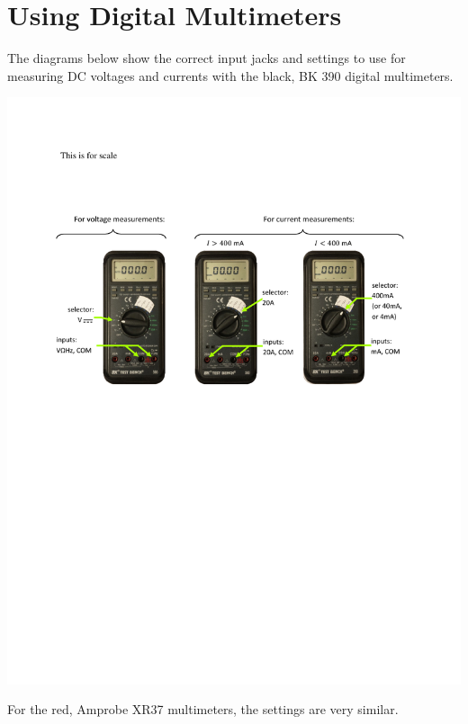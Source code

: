 \section{Using Digital Multimeters}
\label{digital_multimeters}

The diagrams below show the correct input jacks and settings to use 
for measuring DC voltages and currents 
with the black, BK 390 digital multimeters.

\includegraphics[width=\textwidth]{appendices/digital_multimeters/dmm_figs_bk390.pdf}

\vspace{\fill}
For the red, Amprobe XR37 multimeters, the settings are very similar.

